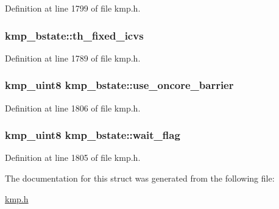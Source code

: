 Definition at line 1799 of file kmp.\-h.

\hypertarget{structkmp__bstate_aa4c7f2abe8346603fe96d8c17555872b}{
\subsubsection[{th\-\_\-fixed\-\_\-icvs}]{ kmp\-\_\-bstate\-::th\-\_\-fixed\-\_\-icvs}}\label{structkmp__bstate_aa4c7f2abe8346603fe96d8c17555872b}


Definition at line 1789 of file kmp.\-h.

\hypertarget{structkmp__bstate_a76d7182b9224f9a340803e0f9de877da}{
\subsubsection[{use\-\_\-oncore\-\_\-barrier}]{\setlength{\rightskip}{0pt plus 5cm}kmp\-\_\-uint8 kmp\-\_\-bstate\-::use\-\_\-oncore\-\_\-barrier}}\label{structkmp__bstate_a76d7182b9224f9a340803e0f9de877da}


Definition at line 1806 of file kmp.\-h.

\hypertarget{structkmp__bstate_a0247461ecd2e0778986c49789fe9812d}{
\subsubsection[{wait\-\_\-flag}]{\setlength{\rightskip}{0pt plus 5cm}kmp\-\_\-uint8 kmp\-\_\-bstate\-::wait\-\_\-flag}}\label{structkmp__bstate_a0247461ecd2e0778986c49789fe9812d}


Definition at line 1805 of file kmp.\-h.



The documentation for this struct was generated from the following file\-:\begin{DoxyCompactItemize}
\item 
\hyperlink{kmp_8h}{kmp.\-h}\end{DoxyCompactItemize}
